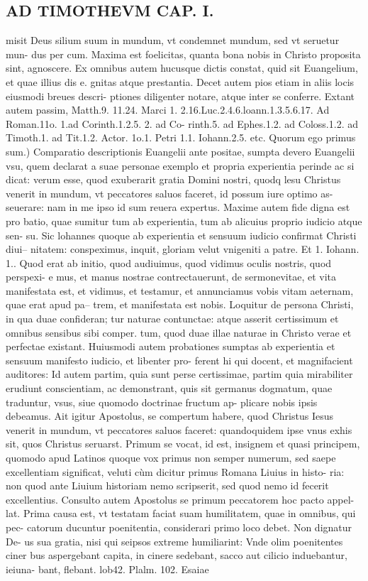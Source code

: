 \documentclass{article}
\begin{document}
\begin{pages}
\section*{AD TIMOTHEVM CAP. I. }
\marginpar{[ p.52 ]}\pstart misit Deus silium suum in mundum, vt condemnet mundum, sed vt seruetur mun- dus per cum. Maxima est foelicitas, quanta bona nobis in Christo proposita sint, agnoscere.  \pend\pstart Ex omnibus autem hucusque dictis constat, quid sit Euangelium, et quae illius dis e. gnitas atque prestantia. Decet autem pios etiam in aliis locis eiusmodi breues descri- ptiones diligenter notare, atque  inter se conferre. Extant autem passim, Matth.9. 11.24. Marci 1. 2.16.Luc.2.4.6.loann.1.3.5.6.17. Ad Roman.11o. 1.ad Corinth.1.2.5. 2. ad Co- rinth.5. ad Ephes.1.2. ad Coloss.1.2. ad Timoth.1. ad Tit.1.2. Actor. 1o.1. Petri 1.1. Iohann.2.5. etc.  \pend\pstart Quorum ego primus sum.) Comparatio descriptionis Euangelii ante positae, sumpta devero Euangelii vsu, quem declarat a suae personae exemplo et propria experientia perinde ac si dicat: verum esse, quod exuberarit gratia Domini nostri, quodq lesu Christus venerit in mundum, vt peccatores saluos faceret, id possum iure optimo as- seuerare: nam in me ipso id sum reuera expertus. Maxime autem fide digna est pro batio, quae sumitur tum ab experientia, tum ab alicuius proprio iudicio atque sen- su. Sic lohannes quoque ab experientia et sensuum iudicio confirmat Christi diui-- nitatem: conspeximus, inquit, gloriam velut vnigeniti a patre. Et 1. Iohann. 1.. Quod erat ab initio, quod audiuimus, quod vidimus oculis nostris, quod perspexi- e mus, et manus nostrae contrectauerunt, de sermonevitae, et vita manifestata est, et   vidimus, et testamur, et annunciamus vobis vitam aeternam, quae erat apud pa-- trem, et manifestata est nobis. Loquitur de persona Christi, in qua duae confideran; tur naturae contunctae: atque asserit certissimum et omnibus sensibus sibi comper. tum, quod duae illae naturae in Christo verae et perfectae existant. Huiusmodi autem probationes sumptas ab experientia et sensuum manifesto iudicio, et libenter pro- ferent hi qui docent, et magnifacient auditores: Id autem partim, quia sunt perse certissimae, partim quia mirabiliter erudiunt conscientiam, ac demonstrant, quis sit germanus dogmatum, quae traduntur, vsus, siue quomodo doctrinae fructum ap- plicare nobis ipsis debeamus. Ait igitur Apostolus, se compertum habere, quod Christus Iesus venerit in mundum, vt peccatores saluos faceret: quandoquidem ipse vnus exhis sit, quos Christus seruarst. Primum se vocat, id est, insignem et quasi principem, quomodo apud Latinos quoque vox primus non semper numerum, sed saepe excellentiam significat, veluti cùm dicitur primus Romana Liuius in histo- ria: non quod ante Liuium historiam nemo scripserit, sed quod nemo id fecerit excellentius. Consulto autem Apostolus se primum peccatorem hoc pacto appel- lat. Prima causa est, vt testatam faciat suam humilitatem, quae in omnibus, qui pec- catorum ducuntur poenitentia, considerari primo loco debet. Non dignatur De- us sua gratia, nisi qui seipsos extreme humiliarint: Vnde olim poenitentes ciner bus aspergebant capita, in cinere sedebant, sacco aut cilicio induebantur, ieiuna- bant, flebant. lob42. Plalm. 102. Esaiae 
\end{pages}
\end{document}
